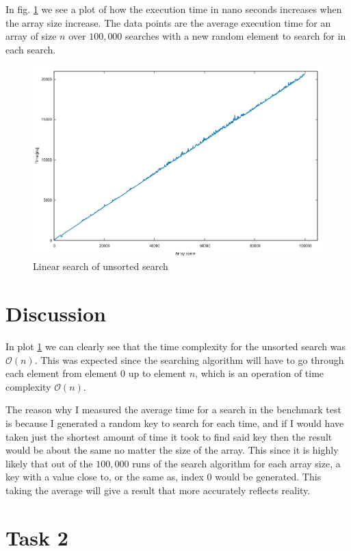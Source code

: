 \documentclass[a4paper,11pt]{article}
\begin{document}
In fig. \ref{fig:unsortedSearch} we see a plot of how the execution time in nano seconds
increases when the array size increase. The data points are the average execution time for
an array of size $n$ over $100,000$ searches with a new random element to search for in each
search.
\begin{figure}[h!]
  \centering
  \includegraphics[width=\textwidth]{unsortedSearch.png}
  \caption{Linear search of unsorted search}
  \label{fig:unsortedSearch}
\end{figure}


\section*{Discussion}

In plot \ref{fig:unsortedSearch} we can clearly see that the time complexity for the unsorted search was $\mathcal{O}(n)$. This was expected since
the searching algorithm will have to go through each element from element $0$ up to element $n$, which is an operation of time complexity
$\mathcal{O}(n)$.

The reason why I measured the average time for a search in the benchmark test is because I generated a random key to search for each time, and
if I would have taken just the shortest amount of time it took to find said key then the result would be about the same no matter the size of the
array. This  since it is highly likely that out of the $100,000$ runs of the search algorithm for each array size, a key with a value close to, or
the same as, index $0$ would be generated. This taking the average will give a result that more accurately reflects reality.

\section*{Task 2}
\end{document}
